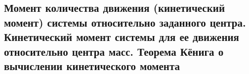 

\subsection{Момент количества движения (кинетический момент) системы относительно заданного центра. Кинетический момент системы для ее движения относительно центра масс. Теорема Кёнига о вычислении кинетического момента}



